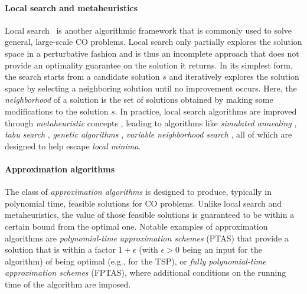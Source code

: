 \documentclass[twoside,11pt]{article}
\begin{document}
\paragraph{Local search and metaheuristics} Local search~\citep{potvin2018handbook} is another algorithmic framework that is commonly used to solve general, large-scale CO problems. Local search only partially explores the solution space in a perturbative fashion and is thus an incomplete approach that does not provide an optimality guarantee on the solution it returns. In its simplest form, the search starts from a candidate solution $s$ and iteratively explores the solution space by selecting a neighboring solution until no improvement occurs. Here, the \emph{neighborhood} of a solution is the set of solutions obtained by making some modifications to the solution $s$. In practice, 
local search algorithms are improved through \textit{metaheuristic} concepts \citep{glover2006handbook}, 
leading to algorithms like \textit{simulated annealing} \citep{van1987simulated,delahaye2019simulated},
\textit{tabu search} \citep{glover1998tabu,laguna2018tabu}, \textit{genetic algorithms} \citep{kramer2017genetic}, 
\textit{variable neighborhood search} \citep{mladenovic1997variable,hansen2019variable}, all of which are designed to help escape \textit{local minima}.

\paragraph{Approximation algorithms} The class of \emph{approximation algorithms} \citep{Vaz+2010} is designed to produce, typically in polynomial time, feasible solutions for CO problems. Unlike local search and metaheuristics,
the value of those feasible solutions is guaranteed to be within a certain bound from the optimal one. 
Notable examples of approximation algorithms are \textit{polynomial-time approximation schemes} (PTAS) 
that provide a solution that is within a factor $1 + \epsilon$ (with $\epsilon > 0$ being an input for the algorithm) of being optimal (e.g., \citet{arora1996polynomial} for the TSP),
or \textit{fully polynomial-time approximation schemes} (FPTAS), where additional conditions on the running time of the algorithm \citep{ausiello2012complexity} are imposed.

\end{document}
